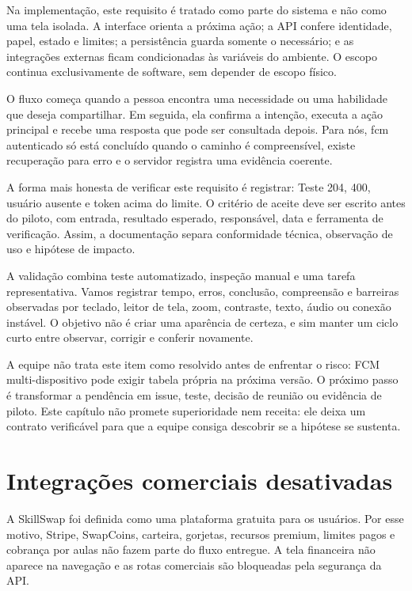 \documentclass[12pt,oneside,a4paper,article]{abntex2}
\begin{document}
Na implementação, este requisito é tratado como parte do sistema e não como uma tela isolada. A interface orienta a próxima ação; a API confere identidade, papel, estado e limites; a persistência guarda somente o necessário; e as integrações externas ficam condicionadas às variáveis do ambiente. O escopo continua exclusivamente de software, sem depender de escopo físico.

O fluxo começa quando a pessoa encontra uma necessidade ou uma habilidade que deseja compartilhar. Em seguida, ela confirma a intenção, executa a ação principal e recebe uma resposta que pode ser consultada depois. Para nós, fcm autenticado só está concluído quando o caminho é compreensível, existe recuperação para erro e o servidor registra uma evidência coerente.

A forma mais honesta de verificar este requisito é registrar: Teste 204, 400, usuário ausente e token acima do limite. O critério de aceite deve ser escrito antes do piloto, com entrada, resultado esperado, responsável, data e ferramenta de verificação. Assim, a documentação separa conformidade técnica, observação de uso e hipótese de impacto.

A validação combina teste automatizado, inspeção manual e uma tarefa representativa. Vamos registrar tempo, erros, conclusão, compreensão e barreiras observadas por teclado, leitor de tela, zoom, contraste, texto, áudio ou conexão instável. O objetivo não é criar uma aparência de certeza, e sim manter um ciclo curto entre observar, corrigir e conferir novamente.

A equipe não trata este item como resolvido antes de enfrentar o risco: FCM multi-dispositivo pode exigir tabela própria na próxima versão. O próximo passo é transformar a pendência em issue, teste, decisão de reunião ou evidência de piloto. Este capítulo não promete superioridade nem receita: ele deixa um contrato verificável para que a equipe consiga descobrir se a hipótese se sustenta.

\section{Integrações comerciais desativadas}

A SkillSwap foi definida como uma plataforma gratuita para os usuários. Por esse motivo, Stripe, SwapCoins, carteira, gorjetas, recursos premium, limites pagos e cobrança por aulas não fazem parte do fluxo entregue. A tela financeira não aparece na navegação e as rotas comerciais são bloqueadas pela segurança da API.
\end{document}

